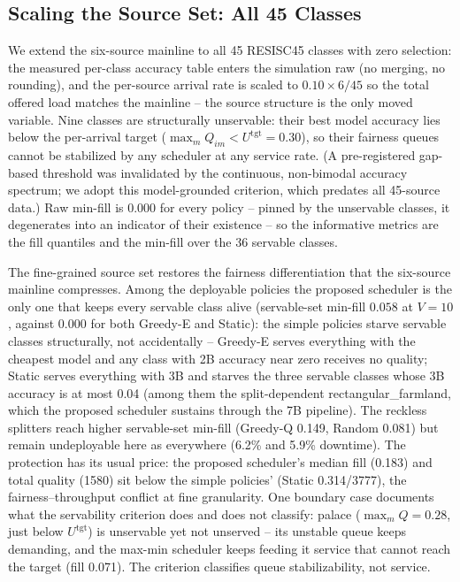 
\subsection{Scaling the Source Set: All 45 Classes}\label{EV_SRC45}
We extend the six-source mainline to all 45 RESISC45 classes with zero
selection: the measured per-class accuracy table enters the simulation raw
(no merging, no rounding), and the per-source arrival rate is scaled to
$0.10 \times 6/45$ so the total offered load matches the mainline -- the
source structure is the only moved variable. Nine classes are structurally
unservable: their best model accuracy lies below the per-arrival target
($\max_m Q_{im} < U^{\mathrm{tgt}} = 0.30$), so their fairness queues cannot
be stabilized by any scheduler at any service rate. (A pre-registered
gap-based threshold was invalidated by the continuous, non-bimodal accuracy
spectrum; we adopt this model-grounded criterion, which predates all
45-source data.) Raw min-fill is 0.000 for every policy -- pinned by the
unservable classes, it degenerates into an indicator of their existence --
so the informative metrics are the fill quantiles and the min-fill over the
36 servable classes.

The fine-grained source set restores the fairness differentiation that the
six-source mainline compresses. Among the deployable policies the proposed
scheduler is the only one that keeps every servable class alive
(servable-set min-fill $0.058$ at $V{=}10$, against $0.000$ for both
Greedy-E and Static): the simple policies starve servable classes
structurally, not accidentally -- Greedy-E serves everything with the
cheapest model and any class with 2B accuracy near zero receives no
quality; Static serves everything with 3B and starves the three servable
classes whose 3B accuracy is at most 0.04 (among them the split-dependent
rectangular\_farmland, which the proposed scheduler sustains through the 7B
pipeline). The reckless splitters reach higher servable-set min-fill
(Greedy-Q 0.149, Random 0.081) but remain undeployable here as everywhere
(6.2\% and 5.9\% downtime). The protection has its usual price: the
proposed scheduler's median fill (0.183) and total quality (1580) sit below
the simple policies' (Static 0.314/3777), the fairness--throughput conflict
at fine granularity. One boundary case documents what the servability
criterion does and does not classify: palace ($\max_m Q = 0.28$, just below
$U^{\mathrm{tgt}}$) is unservable yet not unserved -- its unstable queue
keeps demanding, and the max-min scheduler keeps feeding it service that
cannot reach the target (fill 0.071). The criterion classifies queue
stabilizability, not service.


